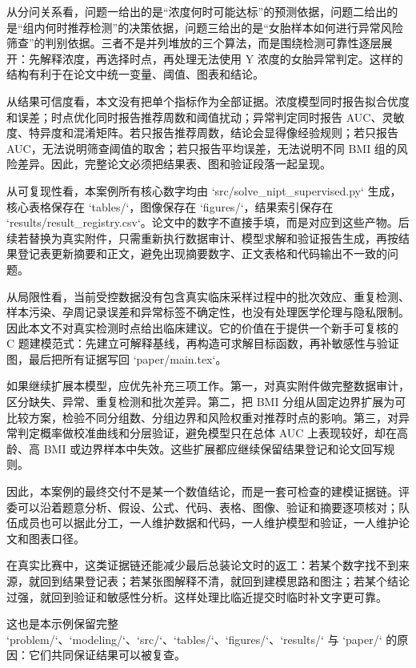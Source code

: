 \documentclass[UTF8]{ctexart}
\begin{document}
从分问关系看，问题一给出的是“浓度何时可能达标”的预测依据，问题二给出的是“组内何时推荐检测”的决策依据，问题三给出的是“女胎样本如何进行异常风险筛查”的判别依据。三者不是并列堆放的三个算法，而是围绕检测可靠性逐层展开：先解释浓度，再选择时点，再处理无法使用 Y 浓度的女胎异常判定。这样的结构有利于在论文中统一变量、阈值、图表和结论。

从结果可信度看，本文没有把单个指标作为全部证据。浓度模型同时报告拟合优度和误差；时点优化同时报告推荐周数和阈值扰动；异常判定同时报告 AUC、灵敏度、特异度和混淆矩阵。若只报告推荐周数，结论会显得像经验规则；若只报告 AUC，无法说明筛查阈值的取舍；若只报告平均误差，无法说明不同 BMI 组的风险差异。因此，完整论文必须把结果表、图和验证段落一起呈现。

从可复现性看，本案例所有核心数字均由 `src/solve_nipt_supervised.py` 生成，核心表格保存在 `tables/`，图像保存在 `figures/`，结果索引保存在 `results/result_registry.csv`。论文中的数字不直接手填，而是对应到这些产物。后续若替换为真实附件，只需重新执行数据审计、模型求解和验证报告生成，再按结果登记表更新摘要和正文，避免出现摘要数字、正文表格和代码输出不一致的问题。

从局限性看，当前受控数据没有包含真实临床采样过程中的批次效应、重复检测、样本污染、孕周记录误差和异常标签不确定性，也没有处理医学伦理与隐私限制。因此本文不对真实检测时点给出临床建议。它的价值在于提供一个新手可复核的 C 题建模范式：先建立可解释基线，再构造可求解目标函数，再补敏感性与验证图，最后把所有证据写回 `paper/main.tex`。

如果继续扩展本模型，应优先补充三项工作。第一，对真实附件做完整数据审计，区分缺失、异常、重复检测和批次差异。第二，把 BMI 分组从固定边界扩展为可比较方案，检验不同分组数、分组边界和风险权重对推荐时点的影响。第三，对异常判定概率做校准曲线和分层验证，避免模型只在总体 AUC 上表现较好，却在高龄、高 BMI 或边界样本中失效。这些扩展都应继续保留结果登记和论文回写规则。

因此，本案例的最终交付不是某一个数值结论，而是一套可检查的建模证据链。评委可以沿着题意分析、假设、公式、代码、表格、图像、验证和摘要逐项核对；队伍成员也可以据此分工，一人维护数据和代码，一人维护模型和验证，一人维护论文和图表口径。

在真实比赛中，这类证据链还能减少最后总装论文时的返工：若某个数字找不到来源，就回到结果登记表；若某张图解释不清，就回到建模思路和图注；若某个结论过强，就回到验证和敏感性分析。这样处理比临近提交时临时补文字更可靠。

这也是本示例保留完整 `problem/`、`modeling/`、`src/`、`tables/`、`figures/`、`results/` 与 `paper/` 的原因：它们共同保证结果可以被复查。
\end{document}
